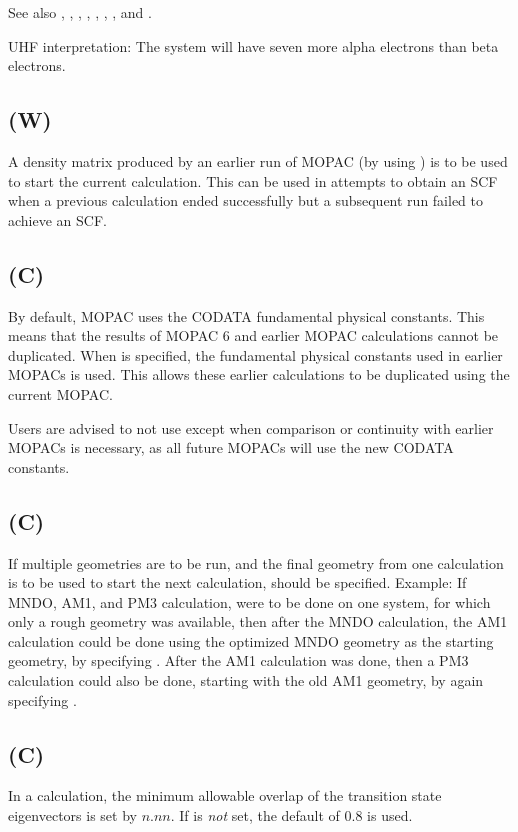 See also , , , , ,
, ,  and .

        UHF interpretation:  The system will have seven  more alpha  electrons
   than beta electrons.


\subsection*{ (W)}
        A density matrix produced by an earlier run of MOPAC (by using ) is to  be  used
   to start the current calculation.  This can be used in attempts to obtain
   an SCF when a previous calculation ended successfully  but  a  subsequent
   run failed to achieve an SCF.

\subsection*{ (C)}
By default, MOPAC uses the CODATA fundamental physical constants.
This means that the results of MOPAC 6 and earlier MOPAC calculations
cannot be duplicated.  When  is specified, the
fundamental physical constants used in earlier MOPACs is used.  This allows
these earlier calculations to be duplicated using the current MOPAC.

Users are advised to not use  except when comparison or continuity
with earlier MOPACs is necessary, as all future MOPACs will use the new
CODATA constants.

\subsection*{ (C)}
        If multiple geometries are to be run, and the  final  geometry  from
   one  calculation  is  to  be  used  to start the next calculation, 
   should be specified.  Example:  If MNDO, AM1, and PM3 calculation,  were
   to  be done on one system, for which only a rough geometry was available,
   then after the MNDO calculation, the AM1 calculation could be done  using
   the  optimized  MNDO  geometry  as  the  starting geometry, by specifying
   .  After the AM1 calculation was done, then a PM3 calculation
could also be done, starting with the old AM1 geometry, by again specifying
.

\subsection*{ (C)}
In a  calculation, the minimum allowable overlap of the transition state
eigenvectors is set by $n.nn$.  If  is {\em not} set, the default
of 0.8 is used.


